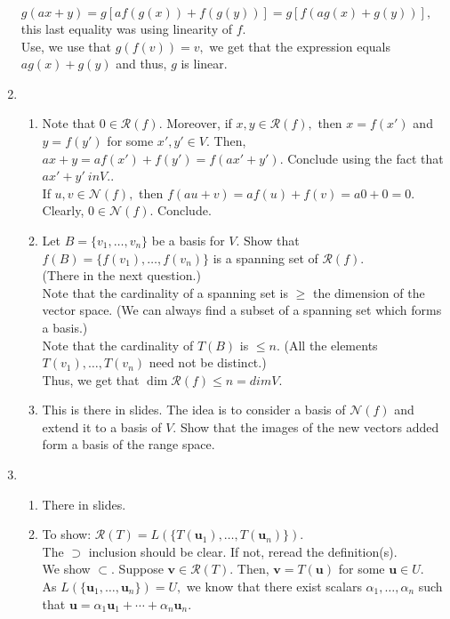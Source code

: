 \documentclass{article}
\begin{document}
\begin{enumerate}
	$g(ax + y) = g[af(g(x)) + f(g(y))] = g[f(ag(x) + g(y))],$ this last equality was using linearity of $f.$\\
	Use, we use that $g(f(v)) = v,$ we get that the expression equals $ag(x) + g(y)$ and thus, $g$ is linear.
	\item 
	\begin{enumerate}[label=(\roman*)] 
		\item Note that $0 \in \mathcal{R}(f).$ Moreover, if $x, y \in \mathcal{R}(f),$ then $x = f(x')$ and $y = f(y')$ for some $x', y' \in V.$ Then, $ax + y = af(x') + f(y') = f(ax' + y').$ Conclude using the fact that $ax' + y' \ in V.$.\\
		If $u, v \in \mathcal{N}(f),$ then $f(au + v) = af(u) + f(v) = a0 + 0 = 0.$ Clearly, $0 \in \mathcal{N}(f).$ Conclude.
		\item Let $B = \{v_1, \ldots, v_n\}$ be a basis for $V.$ Show that $f(B) = \{f(v_1), \ldots, f(v_n)\}$ is a spanning set of $\mathcal{R}(f).$\\
		(There in the next question.)\\
		Note that the cardinality of a spanning set is $\ge$ the dimension of the vector space. (We can always find a subset of a spanning set which forms a basis.)\\
		Note that the cardinality of $T(B)$ is $\le n.$ (All the elements $T(v_1), \ldots, T(v_n)$ need not be distinct.)\\
		Thus, we get that $\dim \mathcal{R}(f) \le n = dim V.$
		\item This is there in slides. The idea is to consider a basis of $\mathcal{N}(f)$ and extend it to a basis of $V.$ Show that the images of the new vectors added form a basis of the range space.
	\end{enumerate}
	\item 
	\begin{enumerate}[label=(\roman*)] 
		\item There in slides.
		\item To show: $\mathcal{R}(T) = L(\{T(\mathbf{u}_1), \ldots, T(\mathbf{u}_n)\}).$\\
		The $\supset$ inclusion should be clear. If not, reread the definition(s).\\
		We show $\subset.$ Suppose $\mathbf{v} \in \mathcal{R}(T).$ Then, $\mathbf{v} = T(\mathbf{u})$ for some $\mathbf{u} \in U.$\\
		As $L\left(\{\mathbf{u}_1, \ldots, \mathbf{u}_n\}\right) = U,$ we know that there exist scalars $\alpha_1, \ldots, \alpha_n$ such that $\mathbf{u} = \alpha_1\mathbf{u}_1 + \cdots + \alpha_n\mathbf{u}_n.$\\

\end{enumerate}
\end{enumerate}
\end{document}
